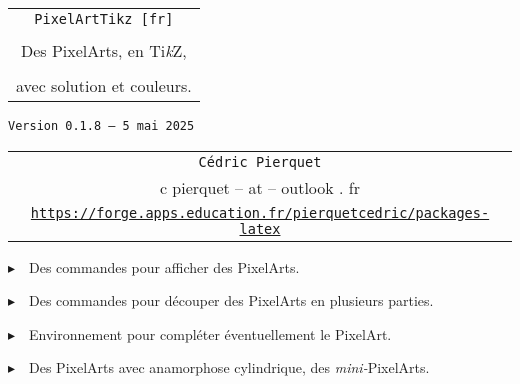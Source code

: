 \documentclass{article}
\def\TPversion{0.1.8}
\def\TPdate{5 mai 2025}
\begin{document}
\pagestyle{fancy}

\thispagestyle{empty}

\vspace{2cm}

\begin{center}
	\begin{minipage}{0.75\linewidth}
	\begin{tcolorbox}[colframe=yellow,colback=yellow!15]
		\begin{center}
			\begin{tabular}{c}
				{\Huge \texttt{PixelArtTikz [fr]}}\\
				\\
				{\LARGE Des PixelArts, en Ti\textit{k}Z}, \\
				\\
				{\LARGE avec solution et couleurs.} \\
			\end{tabular}
			
			\medskip
			
			{\small \texttt{Version \TPversion{} -- \TPdate}}
		\end{center}
	\end{tcolorbox}
\end{minipage}
\end{center}

\vspace{0.5cm}

\begin{center}
	\begin{tabular}{c}
	\texttt{Cédric Pierquet}\\
	{\ttfamily c pierquet -- at -- outlook . fr}\\
	\texttt{\url{https://forge.apps.education.fr/pierquetcedric/packages-latex}}
\end{tabular}
\end{center}

\vspace{0.25cm}

{$\blacktriangleright$~~Des commandes pour afficher des PixelArts.}

\smallskip

{$\blacktriangleright$~~Des commandes pour découper des PixelArts en plusieurs parties.}

\smallskip

{$\blacktriangleright$~~Environnement pour compléter éventuellement le PixelArt.}

\smallskip

{$\blacktriangleright$~~Des PixelArts avec anamorphose cylindrique, des \textit{mini-}PixelArts.}
\end{document}
